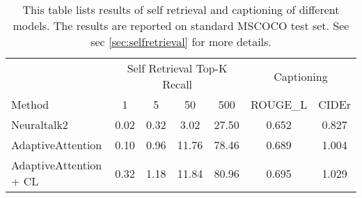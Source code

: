 \begin{table}
\small
\centering
\begin{tabular}{lcccccc}
\toprule
	& \multicolumn{4}{c}{Self Retrieval Top-K Recall} & \multicolumn{2}{c}{Captioning} \\
\cmidrule(l{5pt}r{5pt}){2-5} \cmidrule(l{5pt}r{5pt}){6-7} 
Method               & 1 & 5 & 50 & 500 & ROUGE\_L & CIDEr \\ 
\midrule
Neuraltalk2 \cite{karpathy2015deep} & 0.02 & 0.32 & 3.02 & 27.50 & 0.652 & 0.827 \\
AdaptiveAttention \cite{lu2016knowing} & 0.10 & 0.96 & 11.76 & 78.46 & 0.689 & 1.004 \\
AdaptiveAttention + CL & 0.32 & 1.18 & 11.84 & 80.96 & 0.695 & 1.029 \\
\bottomrule
\end{tabular}
\vspace{1mm}
\caption{\small This table lists results of self retrieval and captioning of different models. 
The results are reported on standard MSCOCO test set.
See sec \ref{sec:selfretrieval} for more details.}
\label{tab:selfretrieval}
\vspace{-5mm}
\end{table}
